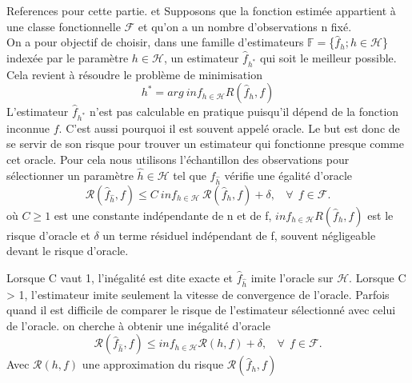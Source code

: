 \documentclass[
]{book}
\begin{document}
References pour cette partie.\label{eq:oracle} et \label{eq:est-ad} \newline
Supposons que la fonction estimée appartient à une classe fonctionnelle \(\mathcal{F}\) et qu'on a un nombre d'observations n fixé.\\
On a pour objectif de choisir, dans une famille d'estimateurs \(\mathbb{F} =\)\{\(\hat{f}_h ; h\in \mathcal{H}\)\} indexée par le paramètre \(h \in \mathcal{H}\), un estimateur \(\hat{f}_{h^*}\) qui soit le meilleur possible.\\
Cela revient à résoudre le problème de minimisation
\[
h^*=arg~inf_{h \in \mathcal{H}} R(\hat{f}_h,f)
\]
L'estimateur \(\hat{f}_{h^*}\) n'est pas calculable en pratique puisqu'il dépend de la fonction inconnue \(f\). C'est aussi pourquoi il est souvent appelé oracle. Le but est donc de se servir de son risque pour trouver un estimateur qui fonctionne presque comme cet oracle. Pour cela nous utilisons l'échantillon des observations pour sélectionner un paramètre \(\hat{h} \in \mathcal{H}\) tel que \(\hat{f}_{\hat{h}}\) vérifie une égalité d'oracle
\[
\mathcal{R}(\hat{f}_{\hat{h}},f) \leq C~inf_{h\in \mathcal{H}}~\mathcal{R}(\hat{f}_{h},f)+\delta,~~~~\forall~~f \in \mathcal{F}.
\]
où \(C \geq 1\) est une constante indépendante de n et de f, \(inf_{h\in \mathcal{H}}R(\hat{f}_h,f)\) est le risque d'oracle et \(\delta\) un terme résiduel indépendant de f, souvent négligeable devant le risque d'oracle.\\

\begin{rem}
Lorsque C vaut 1, l'inégalité est dite exacte et $\hat{f}_{\hat{h}}$ imite l'oracle sur $\mathcal{H}$. \newline
Lorsque C > 1, l'estimateur imite seulement la vitesse de convergence de l'oracle.\newline
Parfois quand il est difficile de comparer le risque de l'estimateur sélectionné avec celui de l'oracle. on cherche à obtenir une inégalité d'oracle
$$
\mathcal{R}(\hat{f}_{\hat{h}},f) \leq inf_{h \in \mathcal{H}}\mathcal{R}(h,f)+\delta,~~~~\forall~~f \in \mathcal{F}.
$$
 Avec $\mathcal{R}(h,f)$ une approximation du risque $\mathcal{R}(\hat{f}_{h},f)$ 
\end{rem}
\end{document}
